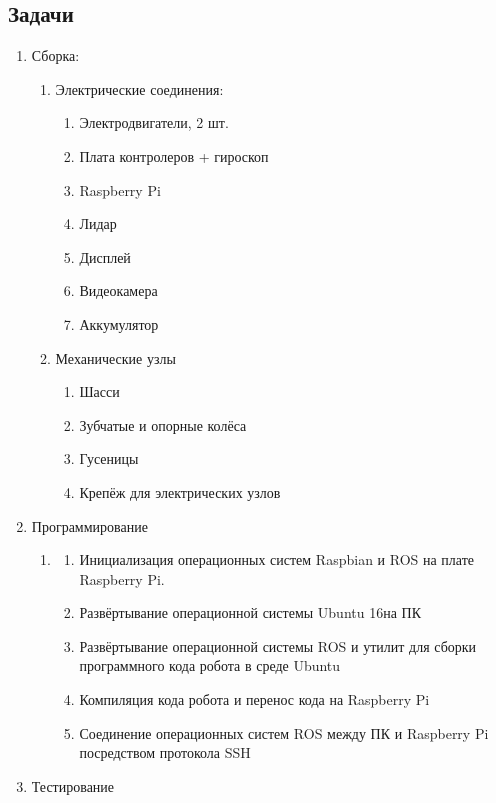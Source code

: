 \documentclass[a4paper]{article}
\begin{document}
\subsection{Задачи}
\begin{enumerate}[series=listWWNumxxiii,label=\arabic*),ref=\arabic*]
\item Сборка:

\begin{enumerate}[series=listWWNumxxiii,label=\alph*),ref=\alph*]
\item Электрические соединения:

\begin{enumerate}[series=listWWNumxxiii,label=\roman*),ref=\roman*]
\item Электродвигатели, 2 шт.
\item Плата контролеров + гироскоп
\item Raspberry Pi
\item Лидар
\item Дисплей
\item Видеокамера
\item Аккумулятор 
\end{enumerate}
\item Механические узлы

\begin{enumerate}[resume*=listWWNumxxiii,start=1]
\item Шасси
\item Зубчатые и опорные колёса
\item Гусеницы
\item Крепёж для электрических узлов
\end{enumerate}
\end{enumerate}
\item Программирование

\begin{enumerate}[resume*=listWWNumxxiii,start=1]
\item \begin{enumerate}[resume*=listWWNumxxiii,start=1]
\item Инициализация операционных систем Raspbian и ROS на плате Raspberry Pi.
\item Развёртывание операционной системы Ubuntu 16на ПК
\item Развёртывание операционной системы ROS и утилит для сборки программного кода робота в среде Ubuntu
\item Компиляция кода робота и перенос кода на Raspberry Pi
\item Соединение операционных систем ROS между ПК и Raspberry Pi посредством протокола SSH
\end{enumerate}
\end{enumerate}
\item Тестирование


\end{enumerate}
\end{document}
